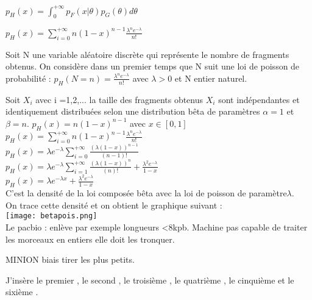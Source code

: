 \documentclass{book}
\begin{document}
$p_{H}(x) = \int_{0}^{+\infty} p_{F}(x|\theta) p_{G}(\theta)d\theta$

$p_{H}(x) = \sum_{i=0}^{+\infty}n(1-x)^{n-1}\frac{\lambda^{n}e^{-\lambda}}{n!}$

Soit N une variable aléatoire discrète qui représente le nombre de fragments obtenus.
On considère dans un premier temps que N suit une loi de poisson de probabilité : 
$p_{H}(N=n) =\frac{\lambda^{n}e^{-\lambda}}{n!}$
avec $\lambda >0 $ et N entier naturel.

Soit $X_i$ avec i =1,2,... la taille des fragments obtenus 
$X_i$ sont indépendantes et identiquement distribuées selon une distribution bêta de paramètres $\alpha = 1$ et $\beta=n$.
$p_{H}(x) =n(1-x)^{n-1}$ avec $x\in[0,1]$\\
$p_{H}(x) = \sum_{i=0}^{+\infty}n(1-x)^{n-1}\frac{\lambda^{n}e^{-\lambda}}{n!}$\\
$p_{H}(x)= \lambda e^{-\lambda}\sum_{i=0}^{+\infty}\frac{(\lambda (1-x))^{n-1}}{(n-1)!}$ \\
$p_{H}(x)= \lambda e^{-\lambda}\sum_{i=1}^{+\infty}\frac{(\lambda (1-x))^{n}}{(n)!} + \frac{\lambda^{2}e^{-\lambda}}{1-x}$ \\
$p_{H}(x)= \lambda e^{-\lambda x} + \frac{\lambda^{2}e^{-\lambda}}{1-x}$ \\
C'est la densité de la loi composée bêta avec la loi de poisson de paramètre$\lambda$. \\
On trace cette densité et on obtient le graphique suivant : \\
\texttt{[image: betapois.png]}\\

Le pacbio : enlève par exemple longueurs <8kpb. Machine pas capable de traiter les morceaux en entiers elle doit les tronquer.

MINION biais tirer les plus petits.

J'insère le premier \cite{ref}, le second \cite{ref2}, le troisième \cite{ref3}, le quatrième \cite{ref4}, le cinquième \cite{ref5} et le sixième \cite{ref6}.


\end{document}

